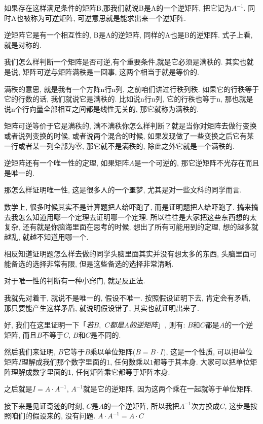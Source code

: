 如果存在这样满足条件的矩阵B,那我们就说B是A的一个逆矩阵, 把它记为$A^{-1}$. 同时A也被称为可逆矩阵, 可逆意思就是能求出来一个逆矩阵. 

逆矩阵它是有一个相互性的, B是A的逆矩阵, 同样的A也是B的逆矩阵. 式子上看, 就是对称的.

我们怎么样判断一个矩阵是否可逆,有个重要条件,就是它必须是满秩的. 其实也就是说, 矩阵可逆与矩阵满秩是一回事, 这两个相当于就是等价的. 

满秩的意思, 就是我有一个方阵n行n列, 之前咱们讲过行秩列秩. 如果它的行秩等于它的行数的话, 我们就说它是满秩的. 比如说n行n列, 它的行秩也等于n, 那也就是说n个行向量全部相互之间都是线性无关的, 那它就称为满秩的. 

矩阵可逆等价于它是满秩的, 满不满秩你怎么样判断？就是当你对矩阵去做行变换或者说列变换的时候, 或者说两个混合的时候, 如果发现做了一些变换之后它有某一行或者某一列全部为零, 那它就不是满秩的, 除此之外它就是一个满秩的. 

逆矩阵还有一个唯一性的定理, 如果矩阵$A$是一个可逆的, 那它逆矩阵不光存在而且是唯一的. 

那怎么样证明唯一性, 这是很多人的一个噩梦, 尤其是对一些文科的同学而言. 

数学上, 很多时候其实不是计算题把人给吓跑了, 而是证明题把人给吓跑了. 搞来搞去我怎么知道用哪一个定理去证明哪一个定理. 所以往往是大家把这些东西想的太复杂, 还有就是你脑海里面在思考的时候, 想出了所有可能用到的定理, 想的越多就越乱, 就越不知道用哪一个. 

相反知道证明题怎么样去做的同学头脑里面其实并没有想太多的东西, 头脑里面可能备选的选择非常有限, 但是这些备选的选择非常清晰. 

对于唯一性的判断有一种小窍门, 就是反正法. 

我就先对着干, 就说不是唯一的, 假设不唯一. 按照假设证明下去, 肯定会有矛盾, 那只要能产生这样矛盾, 就说明假设错了, 其实也就证明出来了. 

好, 我们在这里证明一下「\textit{若$B,$ $C$都是$A$的逆矩阵}」,  则有: $B$和$C$都是$A$的一个逆矩阵, 而且$B$不等于$C$, $B$和$C$是不同的. 

然后我们来证明, $B$它等于$B$乘以单位矩阵($B = B\cdot I$), 这是一个性质, 可以把单位矩阵$I$理解成我们那个数字里面的$1$, 任何数乘以$1$都等于其本身. 大家可以把单位矩阵理解成数字里面的1, 任何矩阵乘它都等于矩阵本身. 

之后就是$I = A \cdot A^{-1}$, $A^{-1}$就是它的逆矩阵, 因为这两个乘在一起就等于单位矩阵. 

接下来是见证奇迹的时刻, $C$是$A$的一个逆矩阵, 所以我把$A^{-1}$次方换成$C$, 这步是按照咱们的假设来的, 没有问题. $A\cdot A^{-1} = A \cdot C$ 

